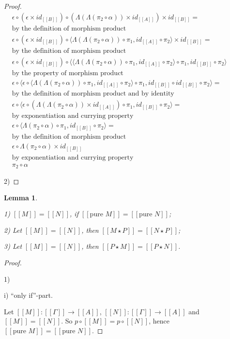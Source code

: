 \documentclass[a4paper]{article}
\newtheorem{lemma}{Lemma}
\begin{document}
\begin{proof}
$\begin{array}{lll}
&\epsilon \circ (\epsilon \times id_{[\![B]\!]}) \circ (\Lambda(\Lambda(\pi_2 \circ
\alpha)) \times id_{[\![A]\!]}) \times id_{[\![B]\!]} =&\\
&\text{by the definition of morphism product}&\\
&\epsilon \circ (\epsilon \times id_{[\![B]\!]}) \circ \langle \Lambda(\Lambda(\pi_2 \circ
\alpha)) \circ \pi_1, id_{[\![A]\!]} \circ \pi_2 \rangle \times id_{[\![B]\!]} = & \\
&\text{by the definition of morphism product}& \\
&\epsilon \circ (\epsilon \times id_{[\![B]\!]}) \circ \langle \langle \Lambda(\Lambda(\pi_2 \circ
\alpha)) \circ \pi_1, id_{[\![A]\!]} \circ \pi_2 \rangle \circ \pi_1, id_{[\![B]\!]} \circ \pi_2 \rangle & \\
&\text{by the property of morphism product}& \\
&\epsilon \circ \langle \epsilon \circ \langle \Lambda(\Lambda(\pi_2 \circ
\alpha)) \circ \pi_1, id_{[\![A]\!]} \circ \pi_2 \rangle \circ \pi_1, id_{[\![B]\!]} \circ id_{[\![B]\!]} \circ \pi_2 \rangle = &\\
&\text{by the definition of morphism product and by identity}& \\
&\epsilon \circ \langle \epsilon \circ (\Lambda(\Lambda(\pi_2 \circ \alpha)) \times id_{[\![A]\!]}) \circ \pi_1, id_{[\![B]\!]} \circ \pi_2 \rangle = & \\
&\text{by exponentiation and currying property}& \\
&\epsilon \circ \langle \Lambda(\pi_2 \circ \alpha) \circ \pi_1, id_{[\![B]\!]} \circ \pi_2 \rangle = & \\
&\text{by the definition of morphism product}&\\
&\epsilon \circ \Lambda(\pi_2 \circ \alpha) \times id_{[\![B]\!]} & \\
&\text{by exponentiation and currying property}& \\
&\pi_2 \circ \alpha&
\end{array}$

\vspace{\baselineskip}

2) 

\end{proof}

\begin{lemma}
$ $

1) $[\![M]\!] = [\![N]\!]$, if $[\![\text{pure }  M]\!] = [\![\text{pure } N]\!]$;

2) Let $[\![M]\!] = [\![N]\!]$, then $[\![M \star P]\!] = [\![N \star P]\!]$;

3) Let $[\![M]\!] = [\![N]\!]$, then $[\![P \star M]\!] = [\![P \star N]\!]$.
\end{lemma}

\begin{proof}

$ $

1)

i) ``only if''-part.

Let $[\![M]\!] : [\![\Gamma]\!] \to [\![A]\!]$, $[\![N]\!] : [\![\Gamma]\!] \to [\![A]\!]$ and $[\![M]\!] =
[\![N]\!]$. So $p \circ [\![M]\!] = p \circ [\![N]\!]$, hence $[\![\text{pure } M]\!] = [\![\text{pure }
N]\!]$.


\end{proof}
\end{document}
